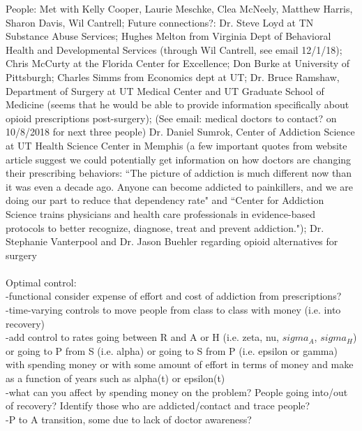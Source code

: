 \documentclass[12pt]{article}
\begin{document}
People: Met with Kelly Cooper, Laurie Meschke, Clea McNeely, Matthew Harris, Sharon Davis, Wil Cantrell; Future connections?: Dr. Steve Loyd at TN Substance Abuse Services; Hughes Melton from Virginia Dept of Behavioral Health and Developmental Services (through Wil Cantrell, see email 12/1/18); Chris McCurty at the Florida Center for Excellence; Don Burke at University of Pittsburgh; Charles Simms from Economics dept at UT;  Dr. Bruce Ramshaw, Department of Surgery at UT Medical Center and UT Graduate School of Medicine (seems that he would be able to provide information specifically about opioid prescriptions post-surgery); (See email: medical doctors to contact? on 10/8/2018 for next three people) Dr. Daniel Sumrok, Center of Addiction Science at UT Health Science Center in Memphis (a few important quotes from website article suggest we could potentially get information on how doctors are changing their prescribing behaviors: ``The picture of addiction is much different now than it was even a decade ago. Anyone can become addicted to painkillers, and we are doing our part to reduce that dependency rate" and ``Center for Addiction Science trains physicians and health care professionals in evidence-based protocols to better recognize, diagnose, treat and prevent addiction."); Dr. Stephanie Vanterpool and Dr. Jason Buehler regarding opioid alternatives for surgery 
\\ \\

Optimal control: \\
-functional consider expense of effort and cost of addiction from prescriptions? \\
-time-varying controls to move people from class to class with money (i.e. into recovery) \\
-add control to rates going between R and A or H (i.e. zeta, nu, $sigma_A$, $sigma_H$) or going to P from S (i.e. alpha) or going to S from P (i.e. epsilon or gamma) with spending money or with some amount of effort in terms of money and make as a function of years such as alpha(t) or epsilon(t) \\
-what can you affect by spending money on the problem? People going into/out of recovery? Identify those who are addicted/contact and trace people? \\
-P to A transition, some due to lack of doctor awareness? \\


 



 




\pagebreak



 
\end{document}
